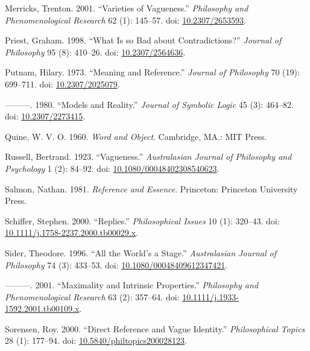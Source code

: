 \documentclass[
  10pt,
  letterpaper,
  DIV=11,
  numbers=noendperiod,
  twoside]{scrartcl}
\newlength{\cslhangindent}
\newenvironment{CSLReferences}[2] %
 {\begin{list}{}{%
  \setlength{\itemindent}{0pt}
  \setlength{\leftmargin}{0pt}
  \setlength{\parsep}{0pt}
  \ifodd #1
   \setlength{\leftmargin}{\cslhangindent}
   \setlength{\itemindent}{-1\cslhangindent}
  \fi
  \setlength{\itemsep}{#2\baselineskip}}}
 {\end{list}}
\begin{document}
\begin{CSLReferences}{1}{0}
Merricks, Trenton. 2001. {``Varieties of Vagueness.''} \emph{Philosophy
and Phenomenological Research} 62 (1): 145--57. doi:
\href{https://doi.org/10.2307/2653593}{10.2307/2653593}.

Priest, Graham. 1998. {``What Is so Bad about Contradictions?''}
\emph{Journal of Philosophy} 95 (8): 410--26. doi:
\href{https://doi.org/10.2307/2564636}{10.2307/2564636}.

Putnam, Hilary. 1973. {``Meaning and Reference.''} \emph{Journal of
Philosophy} 70 (19): 699--711. doi:
\href{https://doi.org/10.2307/2025079}{10.2307/2025079}.

---------. 1980. {``Models and Reality.''} \emph{Journal of Symbolic
Logic} 45 (3): 464--82. doi:
\href{https://doi.org/10.2307/2273415}{10.2307/2273415}.

Quine, W. V. O. 1960. \emph{Word and Object}. Cambridge, MA.: MIT Press.

Russell, Bertrand. 1923. {``Vagueness.''} \emph{Australasian Journal of
Philosophy and Psychology} 1 (2): 84--92. doi:
\href{https://doi.org/10.1080/00048402308540623}{10.1080/00048402308540623}.

Salmon, Nathan. 1981. \emph{Reference and Essence}. Princeton: Princeton
University Press.

Schiffer, Stephen. 2000. {``Replies.''} \emph{Philosophical Issues} 10
(1): 320--43. doi:
\href{https://doi.org/10.1111/j.1758-2237.2000.tb00029.x}{10.1111/j.1758-2237.2000.tb00029.x}.

Sider, Theodore. 1996. {``All the World's a Stage.''} \emph{Australasian
Journal of Philosophy} 74 (3): 433--53. doi:
\href{https://doi.org/10.1080/00048409612347421}{10.1080/00048409612347421}.

---------. 2001. {``Maximality and Intrinsic Properties.''}
\emph{Philosophy and Phenomenological Research} 63 (2): 357--64. doi:
\href{https://doi.org/10.1111/j.1933-1592.2001.tb00109.x}{10.1111/j.1933-1592.2001.tb00109.x}.

Sorensen, Roy. 2000. {``Direct Reference and Vague Identity.''}
\emph{Philosophical Topics} 28 (1): 177--94. doi:
\href{https://doi.org/10.5840/philtopics200028123}{10.5840/philtopics200028123}.


\end{CSLReferences}
\end{document}
